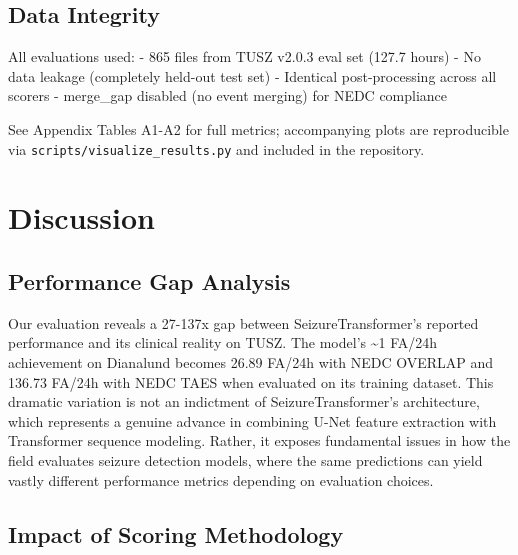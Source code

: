 \hypertarget{data-integrity}{%
\subsection{Data Integrity}\label{data-integrity}}

All evaluations used: - 865 files from TUSZ v2.0.3 eval set (127.7
hours) - No data leakage (completely held-out test set) - Identical
post-processing across all scorers - merge\_gap disabled (no event
merging) for NEDC compliance

See Appendix Tables A1-A2 for full metrics; accompanying plots are
reproducible via \texttt{scripts/visualize\_results.py} and included in
the repository.

\hypertarget{discussion}{%
\section{Discussion}\label{discussion}}

\hypertarget{performance-gap-analysis}{%
\subsection{Performance Gap Analysis}\label{performance-gap-analysis}}

Our evaluation reveals a 27-137x gap between SeizureTransformer's
reported performance and its clinical reality on TUSZ. The model's
\textasciitilde1 FA/24h achievement on Dianalund becomes 26.89 FA/24h
with NEDC OVERLAP and 136.73 FA/24h with NEDC TAES when evaluated on its
training dataset. This dramatic variation is not an indictment of
SeizureTransformer's architecture, which represents a genuine advance in
combining U-Net feature extraction with Transformer sequence modeling.
Rather, it exposes fundamental issues in how the field evaluates seizure
detection models, where the same predictions can yield vastly different
performance metrics depending on evaluation choices.

\hypertarget{impact-of-scoring-methodology}{%
\subsection{Impact of Scoring
Methodology}\label{impact-of-scoring-methodology}}

